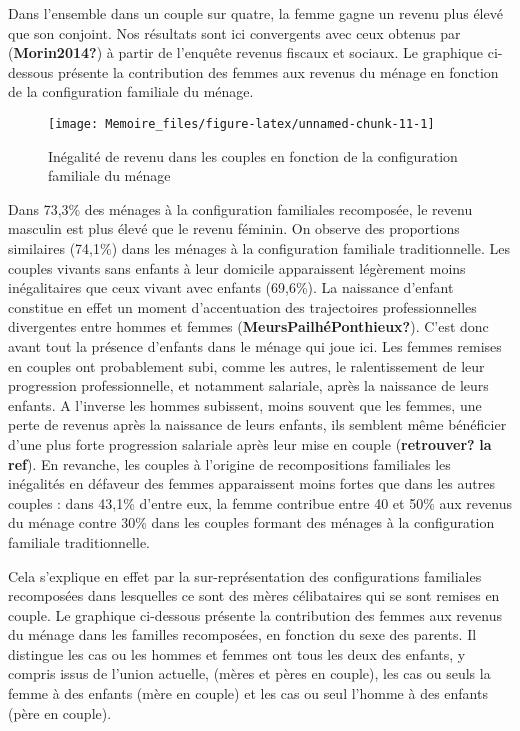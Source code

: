 \documentclass[
  12pt,
]{book}
\begin{document}
Dans l'ensemble dans un couple sur quatre, la femme gagne un revenu plus
élevé que son conjoint. Nos résultats sont ici convergents avec ceux
obtenus par (\textbf{Morin2014?}) à partir de l'enquête revenus fiscaux
et sociaux. Le graphique ci-dessous présente la contribution des femmes
aux revenus du ménage en fonction de la configuration familiale du
ménage.

\begin{figure}[h]

{\centering \texttt{[image: Memoire\_files/figure-latex/unnamed-chunk-11-1]} 

}

\caption{Inégalité de revenu dans les couples en fonction de la configuration familiale du ménage}\label{fig:unnamed-chunk-11}
\end{figure}

Dans 73,3\% des ménages à la configuration familiales recomposée, le
revenu masculin est plus élevé que le revenu féminin. On observe des
proportions similaires (74,1\%) dans les ménages à la configuration
familiale traditionnelle. Les couples vivants sans enfants à leur
domicile apparaissent légèrement moins inégalitaires que ceux vivant
avec enfants (69,6\%). La naissance d'enfant constitue en effet un
moment d'accentuation des trajectoires professionnelles divergentes
entre hommes et femmes (\textbf{MeursPailhéPonthieux?}). C'est donc
avant tout la présence d'enfants dans le ménage qui joue ici. Les femmes
remises en couples ont probablement subi, comme les autres, le
ralentissement de leur progression professionnelle, et notamment
salariale, après la naissance de leurs enfants. A l'inverse les hommes
subissent, moins souvent que les femmes, une perte de revenus après la
naissance de leurs enfants, ils semblent même bénéficier d'une plus
forte progression salariale après leur mise en couple
(\textbf{retrouver?} \textbf{la ref}). En revanche, les couples à
l'origine de recompositions familiales les inégalités en défaveur des
femmes apparaissent moins fortes que dans les autres couples : dans
43,1\% d'entre eux, la femme contribue entre 40 et 50\% aux revenus du
ménage contre 30\% dans les couples formant des ménages à la
configuration familiale traditionnelle.

Cela s'explique en effet par la sur-représentation des configurations
familiales recomposées dans lesquelles ce sont des mères célibataires
qui se sont remises en couple. Le graphique ci-dessous présente la
contribution des femmes aux revenus du ménage dans les familles
recomposées, en fonction du sexe des parents. Il distingue les cas ou
les hommes et femmes ont tous les deux des enfants, y compris issus de
l'union actuelle, (mères et pères en couple), les cas ou seuls la femme
à des enfants (mère en couple) et les cas ou seul l'homme à des enfants
(père en couple).
\end{document}
